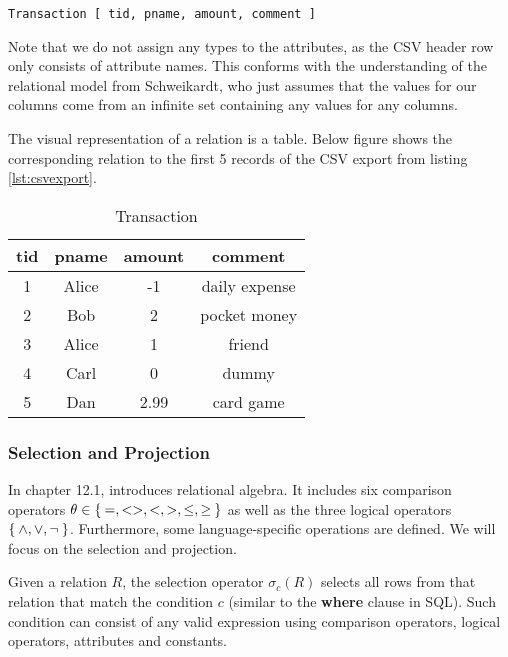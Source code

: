 \begin{center}
\verb+Transaction [ tid, pname, amount, comment ]+
\end{center}

Note that we do not assign any types to the attributes,
as the CSV header row only consists of attribute names.
This conforms with the understanding of the relational model
from Schweikardt, who just assumes that the values for our columns come from an infinite set
containing any values for any columns.

The visual representation of a relation is a table. Below figure shows the
corresponding relation to the first 5 records of the CSV export from listing \ref{lst:csvexport}.

\begin{table}[htbp] \label{Transaction}
    \centering
    \begin{tabular}{|c|c|c|c|}
        \hline
        tid     & pname & amount    & comment \\ \hline\hline
        1       & Alice & -1        & daily expense \\ \hline
        2       & Bob   & 2         & pocket money \\ \hline
        3       & Alice & 1         & friend\\ \hline
        4       & Carl  & 0         & dummy\\ \hline
        5       & Dan   & 2.99      & card game\\ \hline
    \end{tabular}
    \caption{Transaction}
\end{table}

\subsubsection{Selection and Projection}

In chapter 12.1, \cite{Halp08} introduces relational algebra. It includes six
comparison operators $\theta \in \Set{=, <>, <, >, \leq, \geq}$ as well as the
three logical operators $\Set{\land, \lor, \neg}$. Furthermore, some
language-specific operations are defined. We will focus on the selection and projection.

Given a relation $R$, the selection operator $\sigma_c(R)$ selects all rows from
that relation that match the condition $c$ (similar to the \textbf{where} clause in \gls{SQL}).
Such condition can consist of any valid
expression using comparison operators, logical operators, attributes and constants.

